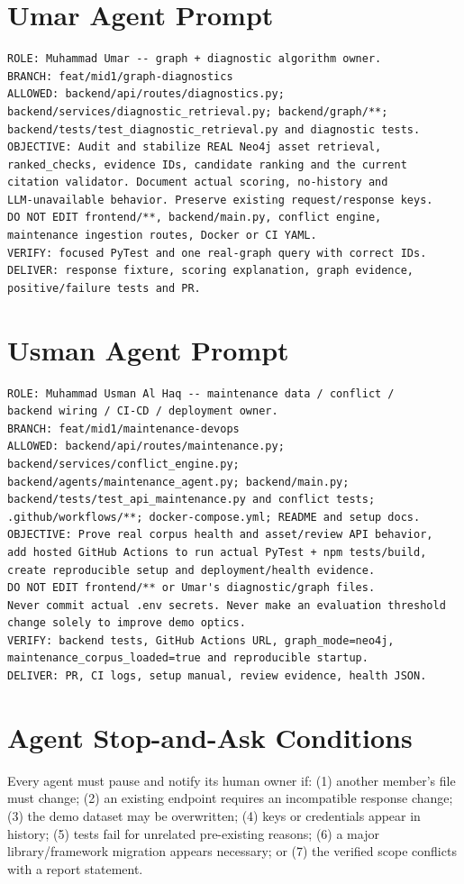 \documentclass[11pt,a4paper,oneside]{report}
\begin{document}
\section{Umar Agent Prompt}
\begin{lstlisting}
ROLE: Muhammad Umar -- graph + diagnostic algorithm owner.
BRANCH: feat/mid1/graph-diagnostics
ALLOWED: backend/api/routes/diagnostics.py;
backend/services/diagnostic_retrieval.py; backend/graph/**;
backend/tests/test_diagnostic_retrieval.py and diagnostic tests.
OBJECTIVE: Audit and stabilize REAL Neo4j asset retrieval,
ranked_checks, evidence IDs, candidate ranking and the current
citation validator. Document actual scoring, no-history and
LLM-unavailable behavior. Preserve existing request/response keys.
DO NOT EDIT frontend/**, backend/main.py, conflict engine,
maintenance ingestion routes, Docker or CI YAML.
VERIFY: focused PyTest and one real-graph query with correct IDs.
DELIVER: response fixture, scoring explanation, graph evidence,
positive/failure tests and PR.
\end{lstlisting}

\section{Usman Agent Prompt}
\begin{lstlisting}
ROLE: Muhammad Usman Al Haq -- maintenance data / conflict /
backend wiring / CI-CD / deployment owner.
BRANCH: feat/mid1/maintenance-devops
ALLOWED: backend/api/routes/maintenance.py;
backend/services/conflict_engine.py;
backend/agents/maintenance_agent.py; backend/main.py;
backend/tests/test_api_maintenance.py and conflict tests;
.github/workflows/**; docker-compose.yml; README and setup docs.
OBJECTIVE: Prove real corpus health and asset/review API behavior,
add hosted GitHub Actions to run actual PyTest + npm tests/build,
create reproducible setup and deployment/health evidence.
DO NOT EDIT frontend/** or Umar's diagnostic/graph files.
Never commit actual .env secrets. Never make an evaluation threshold
change solely to improve demo optics.
VERIFY: backend tests, GitHub Actions URL, graph_mode=neo4j,
maintenance_corpus_loaded=true and reproducible startup.
DELIVER: PR, CI logs, setup manual, review evidence, health JSON.
\end{lstlisting}

\section{Agent Stop-and-Ask Conditions}
Every agent must pause and notify its human owner if: (1) another member's file must change; (2) an existing endpoint requires an incompatible response change; (3) the demo dataset may be overwritten; (4) keys or credentials appear in history; (5) tests fail for unrelated pre-existing reasons; (6) a major library/framework migration appears necessary; or (7) the verified scope conflicts with a report statement.
\end{document}
